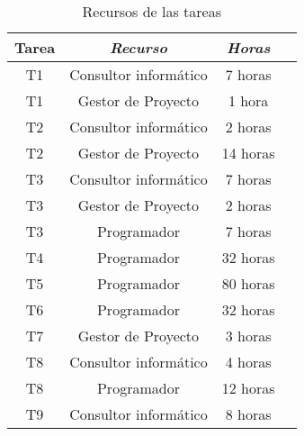 \begin{table}[htp]
	\centering
	\caption{Recursos de las tareas}\label{tab:recursos}
	\begin{tabular}{cccc}
		\toprule
		\textbf{Tarea} & \emph{Recurso} & \emph{Horas}\\
		\midrule
	T1	&	Consultor informático	&	7 horas\\
	T1	&	Gestor de Proyecto		&	1 hora\\
	T2	&	Consultor informático	&	2 horas\\
	T2	&	Gestor de Proyecto		&	14 horas\\
	T3	&	Consultor informático	&	7 horas\\
	T3	&	Gestor de Proyecto		&	2 horas\\
	T3	&	Programador				&	7 horas\\
	T4	&	Programador				&	32 horas\\
	T5	&	Programador				&	80 horas\\
	T6	&	Programador				&	32 horas\\
	T7	&	Gestor de Proyecto		&	3 horas\\
	T8	&	Consultor informático	&	4 horas\\
	T8	&	Programador				& 	12 horas\\
	T9	&	Consultor informático	& 	8 horas\\

		\bottomrule
    \end{tabular}
\end{table}